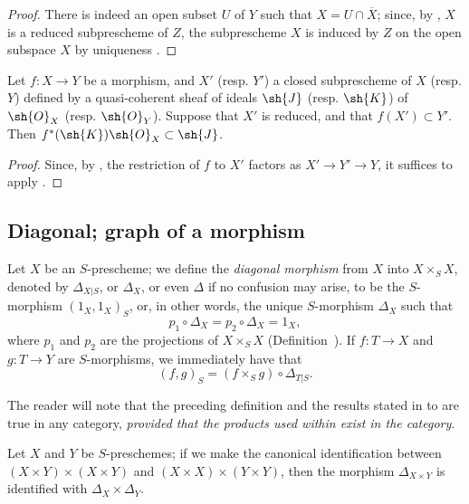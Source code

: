 \begin{proof}
There is indeed an open subset $U$ of $Y$ such that $X=U\cap\overline{X}$;
since, by , $X$ is a reduced subprescheme of $Z$, the subprescheme $X$ is induced by $Z$ on the open subspace $X$ by uniqueness .
\end{proof}

\begin{corollary}[5.2.4]
\label{I.5.2.4}
Let $f:X\to Y$ be a morphism, and $X'$ (resp. $Y'$) a closed subprescheme of $X$ (resp. $Y$) defined by a quasi-coherent sheaf of ideals $\sh{J}$ (resp. $\sh{K}$) of $\sh{O}_X$ (resp. $\sh{O}_Y$).
Suppose that $X'$ is reduced, and that $f(X')\subset Y'$.
Then $f^*(\sh{K})\sh{O}_X\subset\sh{J}$.
\end{corollary}

\begin{proof}
Since, by , the restriction of $f$ to $X'$ factors as $X'\to Y'\to Y$, it suffices to apply .
\end{proof}

\subsection{Diagonal; graph of a morphism}
\label{subsection:I.5.3}
\label{I.5.3}

\begin{env}[5.3.1]
\label{I.5.3.1}
Let $X$ be an $S$-prescheme;
we define the \emph{diagonal morphism} from $X$ into $X\times_S X$, denoted by $\Delta_{X|S}$, or $\Delta_X$, or even $\Delta$ if no confusion may arise, to be the $S$-morphism $(1_X,1_X)_S$, or, in other words, the unique $S$-morphism $\Delta_X$ such that
\[
\label{I.5.3.1.1}
  p_1\circ\Delta_X=p_2\circ\Delta_X=1_X,
  \tag{5.3.1.1}
\]
where $p_1$ and $p_2$ are the projections of $X\times_S X$ (Definition~).
If $f:T\to X$ and $g:T\to Y$ are $S$-morphisms, we immediately have that
\[
\label{I.5.3.1.2}
  (f,g)_S=(f\times_S g)\circ\Delta_{T|S}.
  \tag{5.3.1.2}
\]

The reader will note that the preceding definition and the results stated in  to  are true in any category, \emph{provided that the products used within exist in the category}.
\end{env}

\begin{proposition}[5.3.2]
\label{I.5.3.2}
Let $X$ and $Y$ be $S$-preschemes;
if we make the canonical identification between $(X\times Y)\times(X\times Y)$ and $(X\times X)\times(Y\times Y)$, then the morphism $\Delta_{X\times Y}$ is identified with $\Delta_X\times\Delta_Y$.
\end{proposition}

